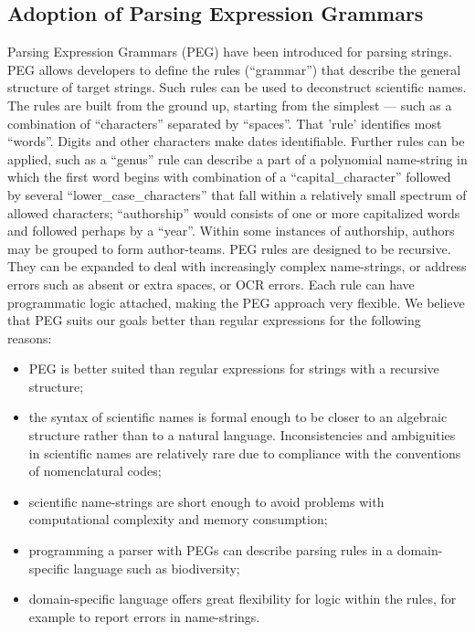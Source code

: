 \documentclass{bmcart}
\begin{document}
\subsection*{Adoption of Parsing Expression Grammars}

Parsing Expression Grammars (PEG) \cite{Ford2004} have been introduced for parsing strings. PEG allows developers to define the rules (``grammar'') that describe the general structure of target strings. Such rules can be used to deconstruct scientific names. The rules are built from the ground up, starting from the simplest --- such as a combination of ``characters'' separated by ``spaces''. That 'rule' identifies most ``words''. Digits and other characters make dates identifiable.  Further rules can be applied, such as a ``genus'' rule can describe a part of a polynomial name-string in which the first word begins with combination of a ``capital\_character'' followed by several ``lower\_case\_characters'' that fall within a relatively small spectrum of allowed characters; ``authorship'' would consists of one or more capitalized words and followed perhaps by a ``year''. Within some instances of authorship,  authors may be grouped to form author-teams. PEG rules are designed to be recursive. They can be expanded to deal with increasingly complex name-strings, or address errors such as absent or extra spaces, or OCR errors. Each rule can have programmatic logic attached, making the PEG approach very flexible. We believe that PEG suits our goals better than regular expressions for the following reasons:

\begin{itemize}

  \item PEG is better suited than regular expressions for strings with a recursive structure;

  \item the syntax of scientific names is formal enough to be closer to an algebraic structure rather than to a natural language. Inconsistencies and ambiguities in scientific names are relatively rare due to compliance with the conventions of nomenclatural codes;

  \item scientific name-strings are short enough to avoid problems with computational complexity and memory consumption;

  \item programming a parser with PEGs can describe parsing rules in a domain-specific language such as biodiversity;

  \item domain-specific language offers great flexibility for logic within the rules, for example to report errors in name-strings.

\end{itemize}
\end{document}
